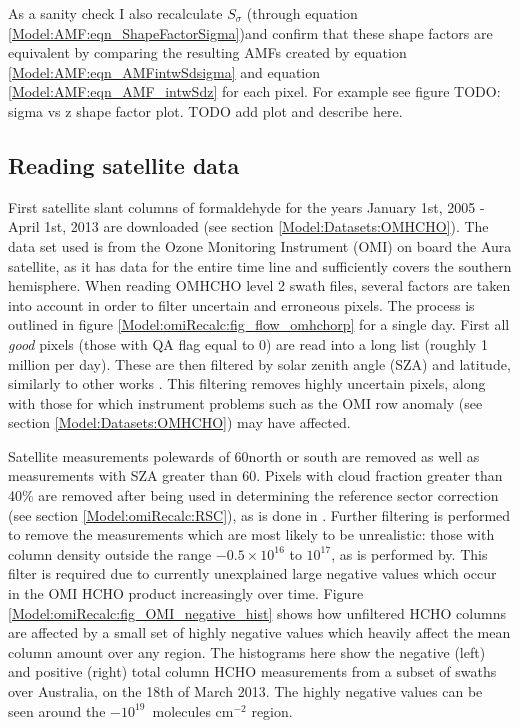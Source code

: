     As a sanity check I also recalculate $S_\sigma$ (through equation \ref{Model:AMF:eqn_ShapeFactorSigma})and confirm that these shape factors are equivalent by comparing the resulting AMFs created by equation \ref{Model:AMF:eqn_AMFintwSdsigma} and equation \ref{Model:AMF:eqn_AMF_intwSdz} for each pixel.
    For example see figure TODO: sigma vs z shape factor plot.
    TODO add plot and describe here.
    
    
  \subsection{Reading satellite data}
    
    First satellite slant columns of formaldehyde for the years January 1st, 2005 - April 1st, 2013 are downloaded (see section \ref{Model:Datasets:OMHCHO}).
    The data set used is from the Ozone Monitoring Instrument (OMI) on board the Aura satellite, as it has data for the entire time line and sufficiently covers the southern hemisphere.
    When reading OMHCHO level 2 swath files, several factors are taken into account in order to filter uncertain and erroneous pixels.
    The process is outlined in figure  \ref{Model:omiRecalc:fig_flow_omhchorp} for a single day.
    First all \textit{good} pixels (those with QA flag equal to 0) are read into a long list (roughly 1 million per day).
    These are then filtered by solar zenith angle (SZA) and latitude, similarly to other works \parencite[eg.]{Marais2012, Barkley2013, Bauwens2016, Zhu2016}.
    This filtering removes highly uncertain pixels, along with those for which instrument problems such as the OMI row anomaly (see section \ref{Model:Datasets:OMHCHO}) may have affected.
    
    Satellite measurements polewards of 60\degr north or south are removed as well as measurements with SZA greater than 60\degr.
    Pixels with cloud fraction greater than 40\% are removed after being used in determining the reference sector correction (see section \ref{Model:omiRecalc:RSC}), as is done in \textcite{Abad2015, DeSmedt2015}.
    Further filtering is performed to remove the measurements which are most likely to be unrealistic: those with column density outside the range $-0.5 \times 10^{16}$ to $10^{17} $\moleccm, as is performed by\textcite{Zhu2016}.
    This filter is required due to currently unexplained large negative values which occur in the OMI HCHO product increasingly over time.
    Figure \ref{Model:omiRecalc:fig_OMI_negative_hist} shows how unfiltered HCHO columns are affected by a small set of highly negative values which heavily affect the mean column amount over any region.
    The histograms here show the negative (left) and positive (right) total column HCHO measurements from a subset of swaths over Australia, on the 18th of March 2013.
    The highly negative values can be seen around the $-10^{19}$~molecules cm$^{-2}$ region.
    
